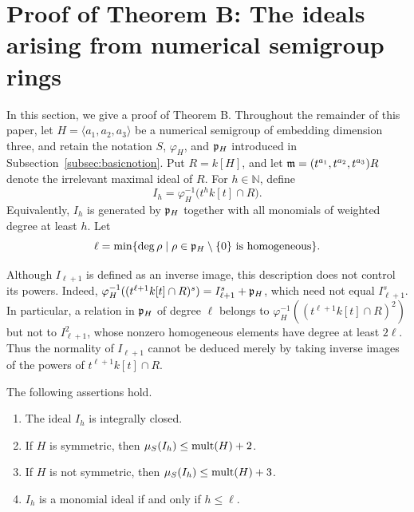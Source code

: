 \section{Proof of Theorem B: The ideals arising from numerical semigroup rings}
\label{sec:target-ideals}


In this section, we give a proof of Theorem B. 
Throughout the remainder of this paper, let
$H=\langle a_1,a_2,a_3\rangle$ be a numerical semigroup of embedding
dimension three, and retain the notation $S$, $\varphi_H$, and $\mathfrak{p}_H$
introduced in Subsection~\ref{subsec:basicnotion}.  Put $R=k[H]$, and let $\mathfrak{m}=(t^{a_1},t^{a_2},t^{a_3})R$ denote the irrelevant maximal ideal of $R$.
For $h\in\mathbb N$, define
$$
 I_h=\varphi_H^{-1}\bigl(t^hk[t]\cap R\bigr).
$$
Equivalently, $I_h$ is generated by $\mathfrak{p}_H$ together with all monomials of
weighted degree at least $h$.
Let
\[
 \ell=\min\{\deg\rho\mid
 \rho\in\mathfrak{p}_H\setminus\{0\}\text{ is homogeneous}\}.
\]

Although $I_{\ell+1}$ is defined as an inverse image, this description does
not control its powers.  Indeed,
$\varphi_H^{-1}((t^{\ell+1}k[t]\cap R)^s)=I_{\ell+1}^s+\mathfrak{p}_H$, which need not
equal $I_{\ell+1}^s$.  In particular, a relation in $\mathfrak{p}_H$ of degree
$\ell$ belongs to $\varphi_H^{-1}((t^{\ell+1}k[t]\cap R)^2)$ but not to
$I_{\ell+1}^2$, whose nonzero homogeneous elements have degree at least
$2\ell$.  Thus the normality of $I_{\ell+1}$ cannot be deduced merely by
taking inverse images of the powers of $t^{\ell+1}k[t]\cap R$.

\begin{proposition}
\label{prop:inverse-image-ideals}
The following assertions hold.
\begin{enumerate}
	\item The ideal $I_h$ is integrally closed.
	\item If $H$ is symmetric, then $\mu_S(I_h) \le \operatorname{mult}(H) + 2$.
	\item If $H$ is not symmetric, then $\mu_S(I_h) \le \operatorname{mult}(H) + 3$.
	\item $I_h$ is a monomial ideal if and only if $h\leq\ell$.
\end{enumerate}
\end{proposition}

